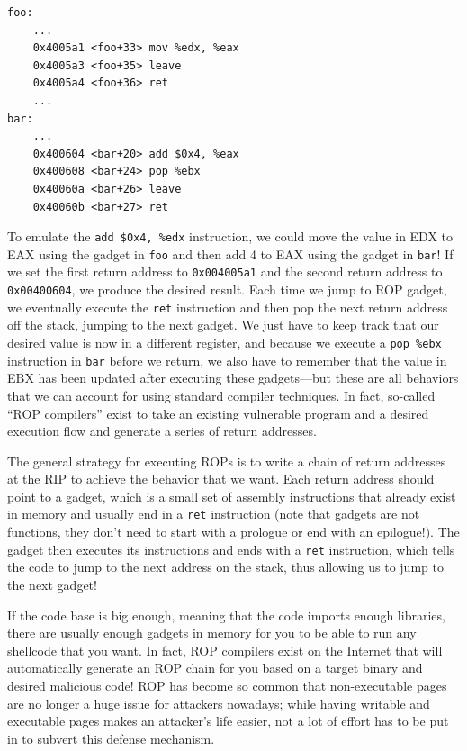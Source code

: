 \documentclass[a4paper]{exam}
\theoremstyle{definition}
\begin{document}
\begin{verbatim}
foo:
    ...
    0x4005a1 <foo+33> mov %edx, %eax
    0x4005a3 <foo+35> leave
    0x4005a4 <foo+36> ret
    ...
bar:
    ...
    0x400604 <bar+20> add $0x4, %eax
    0x400608 <bar+24> pop %ebx
    0x40060a <bar+26> leave
    0x40060b <bar+27> ret
\end{verbatim}

To emulate the \texttt{add\ \$0x4,\ \%edx} instruction, we could move
the value in EDX to EAX using the gadget in \texttt{foo} and then add 4
to EAX using the gadget in \texttt{bar}! If we set the first return
address to \texttt{0x004005a1} and the second return address to
\texttt{0x00400604}, we produce the desired result. Each time we jump to
ROP gadget, we eventually execute the \texttt{ret} instruction and then
pop the next return address off the stack, jumping to the next gadget.
We just have to keep track that our desired value is now in a different
register, and because we execute a \texttt{pop\ \%ebx} instruction in
\texttt{bar} before we return, we also have to remember that the value
in EBX has been updated after executing these gadgets---but these are
all behaviors that we can account for using standard compiler
techniques. In fact, so-called ``ROP compilers'' exist to take an
existing vulnerable program and a desired execution flow and generate a
series of return addresses.

The general strategy for executing ROPs is to write a chain of return
addresses at the RIP to achieve the behavior that we want. Each return
address should point to a gadget, which is a small set of assembly
instructions that already exist in memory and usually end in a
\texttt{ret} instruction (note that gadgets are not functions, they
don't need to start with a prologue or end with an epilogue!). The
gadget then executes its instructions and ends with a \texttt{ret}
instruction, which tells the code to jump to the next address on the
stack, thus allowing us to jump to the next gadget!

If the code base is big enough, meaning that the code imports enough
libraries, there are usually enough gadgets in memory for you to be able
to run any shellcode that you want. In fact, ROP compilers exist on the
Internet that will automatically generate an ROP chain for you based on
a target binary and desired malicious code! ROP has become so common
that non-executable pages are no longer a huge issue for attackers
nowadays; while having writable and executable pages makes an attacker's
life easier, not a lot of effort has to be put in to subvert this
defense mechanism.
\end{document}
